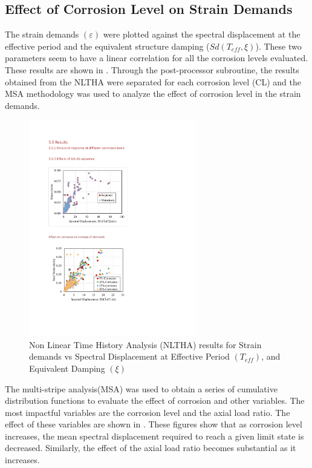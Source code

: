 \subsection{Effect of Corrosion Level on Strain Demands}

The strain demands $(\varepsilon)$ were plotted against the spectral displacement at the effective period and the equivalent structure damping ($Sd(T_{eff},\xi)$). These two parameters seem to have a linear correlation for all the corrosion levels evaluated. These results are shown in . Through the post-processor subroutine, the results obtained from the NLTHA were separated for each corrosion level (CL) and the MSA methodology was used to analyze the effect of corrosion level in the strain demands.

\begin{figure}[htbp]
	\centering
	\includegraphics[width=0.65\textwidth]{VAC Thesis 2.0/Chapter-5/figs/All_results_NLTHA_Figure.pdf}
	\caption{Non Linear Time History Analysis (NLTHA) results for Strain demands vs Spectral Displacement at Effective Period $(T_{eff})$, and Equivalent Damping $(\xi)$}
	\label{fig:all_results_nltha}
\end{figure}

The multi-stripe analysis(MSA) was used to obtain a series of cumulative distribution functions to evaluate the effect of corrosion and other variables. The most impactful variables are the corrosion level and the axial load ratio. The effect of these variables are shown in . These figures show that as corrosion level increases, the mean spectral displacement required to reach a given limit state is decreased. Similarly, the effect of the axial load ratio becomes substantial as it increases.

